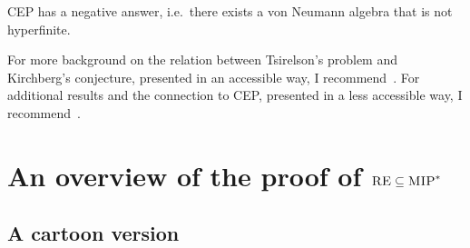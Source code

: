 \begin{corollary}
CEP has a negative answer, i.e.\ there exists a von Neumann algebra that is not hyperfinite. 
\end{corollary}

For more background on the relation between Tsirelson's problem and Kirchberg's conjecture, presented in an accessible way, I recommend~\cite{fritz2012tsirelson}. For additional results and the connection to CEP, presented in a less accessible way, I recommend~\cite{ozawa2013connes}. 


\section{An overview of the proof of $\textsc{RE}\subseteq \textsc{MIP}^*$}


\subsection{A cartoon version}
\label{sec:cartoon}

